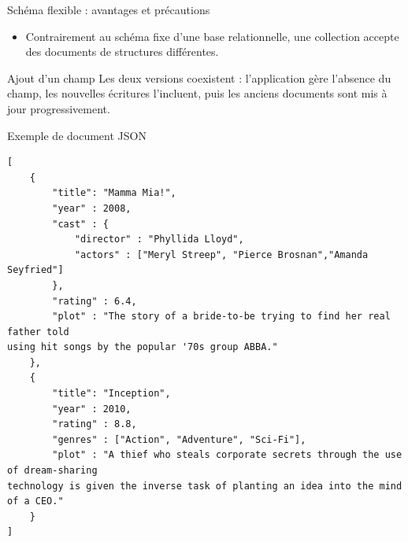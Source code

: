 %
\begin{frame}{Schéma flexible : avantages et précautions}
    \begin{itemize}
        \item Contrairement au schéma fixe d'une base relationnelle, une
              collection accepte des documents de structures différentes.
    \end{itemize}



    \begin{examplebox}{Ajout d'un champ}
        Les deux versions coexistent : l'application gère l'absence du champ,
        les nouvelles écritures l'incluent, puis les anciens documents sont mis
        à jour progressivement.
    \end{examplebox}
\end{frame}

%
%
%

\begin{frame}[fragile]{Exemple de document JSON}

    \begin{verbatim}
[
    {
        "title": "Mamma Mia!",
        "year" : 2008,
        "cast" : {
            "director" : "Phyllida Lloyd",
            "actors" : ["Meryl Streep", "Pierce Brosnan","Amanda Seyfried"]
        },
        "rating" : 6.4,
        "plot" : "The story of a bride-to-be trying to find her real father told
using hit songs by the popular '70s group ABBA."
    },
    {
        "title": "Inception",
        "year" : 2010,
        "rating" : 8.8,
        "genres" : ["Action", "Adventure", "Sci-Fi"],
        "plot" : "A thief who steals corporate secrets through the use of dream-sharing
technology is given the inverse task of planting an idea into the mind of a CEO."
    }
]
\end{verbatim}


\end{frame}

